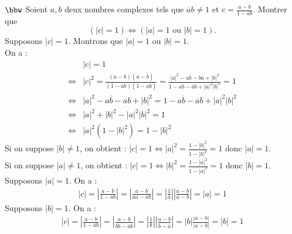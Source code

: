 \documentclass[11pt]{article}
\begin{document}
\begin{exercice}{$\bbw$}{}
    Soient $a,b$ deux nombres complexes tels que $\overline{a}b\neq1$ et $c=\frac{a-b}{1-\overline{a}b}$. Montrer que
    \begin{equation*}
        (|c|=1) \iff (|a| = 1 \text{ ou } |b| = 1).
    \end{equation*}
    \tcblower
    Supposons $|c|=1$. Montrons que $|a|=1$ ou $|b|=1$.\\
    On a :
    \begin{align*}
        &|c|=1\\
        \iff&|c|^2=\frac{(a-b)(\overline{a}-\overline{b})}{(1-\overline{a}b)(1-a\overline{b})}=\frac{|a|^2-a\overline{b}-b\overline{a}+|b|^2}{1-a\overline{b}-\overline{a}b+|a|^2|b|^2}=1\\
        \iff&|a|^2-a\overline{b}-\overline{a}b+|b|^2=1-a\overline{b}-\overline{a}b+|a|^2|b|^2\\
        \iff&|a|^2+|b|^2-|a|^2|b|^2=1\\
        \iff&|a|^2(1-|b|^2)=1-|b|^2
    \end{align*}
    Si on suppose $|b|\neq1$, on obtient : $|c|=1\iff|a|^2=\frac{1-|b|^2}{1-|b|^2}=1$ donc $|a|=1$.\\
    Si on suppose $|a|\neq1$, on obtient : $|c|=1\iff|b|^2=\frac{1-|a|^2}{1-|a|^2}=1$ donc $|b|=1$.\\
    Supposons $|a|=1$. 
    On a :
    \begin{align*}
        |c|=\left|\frac{a-b}{1-\overline{a}b}\right|=\left|\frac{a-b}{\overline{a}a-\overline{a}b}\right|=\left|\frac{1}{\overline{a}}\right|\left|\frac{a-b}{a-b}\right|=|a|=1
    \end{align*}
    Supposons $|b|=1$. 
    On a :
    \begin{align*}
        |c|=\left|\frac{a-b}{1-\overline{a}b}\right|=\left|\frac{a-b}{\overline{b}b-\overline{a}b}\right|=\left|\frac{1}{b}\right|\left|\frac{a-b}{\overline{b}-\overline{a}}\right|=|b|\frac{|a-b|}{|a-b|}=|b|=1
    \end{align*}
\end{exercice}
\end{document}
